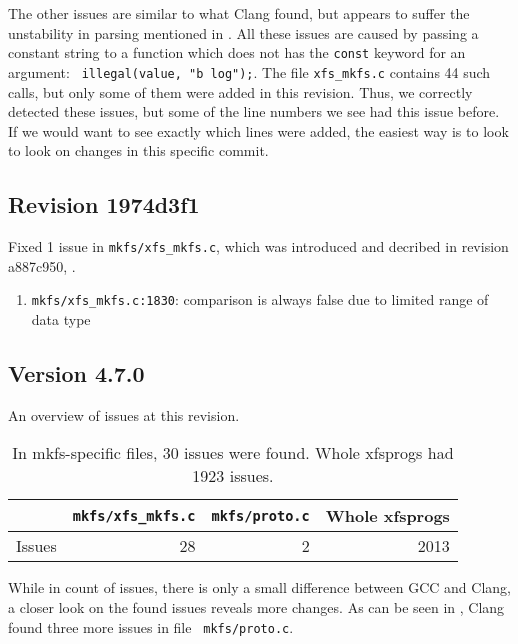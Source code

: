 The other issues are similar to what Clang found, but appears to suffer the
unstability in parsing mentioned in .
All these issues are caused by passing a constant string to a
function which does not has the {\tt const} keyword for an argument: {\tt
illegal(value, "b log");}. The file {\tt xfs\_mkfs.c} contains 44 such
calls, but only some of them were added in this revision. Thus, we correctly
detected these issues, but some of the line numbers we see had this issue
before. If we would want to see exactly which lines were added, the easiest way
is to look to look on changes in this specific commit.


\subsection{Revision 1974d3f1}
Fixed 1 issue in {\tt mkfs/xfs\_mkfs.c}, which was introduced and decribed in revision a887c950, .

\begin{enumerate}
	\item {\tt mkfs/xfs\_mkfs.c:1830}: comparison is always false due
		to limited range of data type
\end{enumerate}

\subsection{Version 4.7.0}\label{chap:results:gcc:4.7}

An overview of issues at this revision.
\begin{table}[h]
\begin{tabular}{|l||r|r||r|}
\hline
& {\tt mkfs/xfs\_mkfs.c} & {\tt mkfs/proto.c} & Whole xfsprogs \\
\hline
Issues & 28 & 2 & 2013 \\
\hline
\end{tabular}
\caption{In mkfs-specific files, 30 issues were found. Whole
xfsprogs had 1923 issues.}
\end{table}

While in count of issues, there is only a small difference between GCC and
Clang, a closer look on the found issues reveals more changes. As can be seen
in , Clang found three more issues in file {\tt
mkfs/proto.c}.

